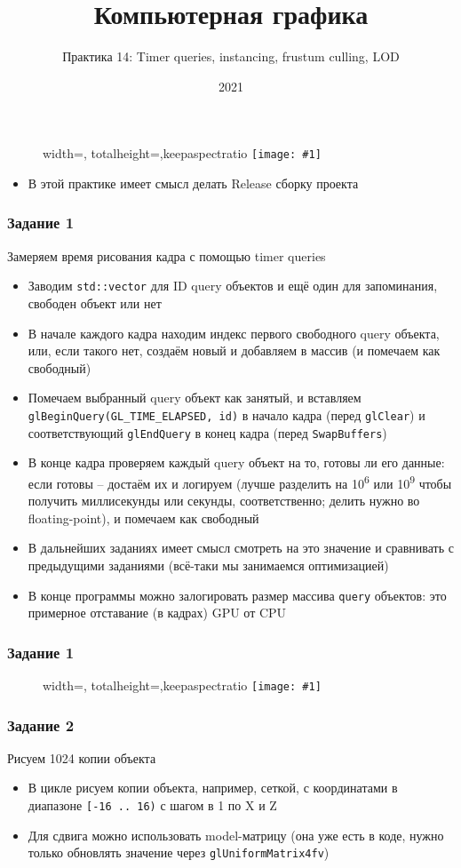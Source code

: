 \documentclass{beamer}
\title{Компьютерная графика}
\subtitle{Практика 14: Timer queries, instancing, frustum culling, LOD}
\date{2021}
\newcommand{\slideimage}[1]{
  \begin{figure}
    \begin{adjustbox}{width=\textwidth, totalheight=\textheight-2\baselineskip-2\baselineskip,keepaspectratio}
      \texttt{[image: \#1]}
    \end{adjustbox}
  \end{figure}
}
\begin{document}
\frame{\titlepage}

\begin{frame}
\slideimage{0.png}
\end{frame}

\begin{frame}[fragile]
\begin{itemize}
\item В этой практике имеет смысл делать Release сборку проекта
\end{itemize}
\end{frame}

\begin{frame}[fragile]
\fontsize{10pt}{10pt}
\frametitle{Задание 1}
Замеряем время рисования кадра с помощью timer queries
\begin{itemize}
\item Заводим \verb|std::vector| для ID query объектов и ещё один для запоминания, свободен объект или нет
\item В начале каждого кадра находим индекс первого свободного query объекта, или, если такого нет, создаём новый и добавляем в массив (и помечаем как свободный)
\item Помечаем выбранный query объект как занятый, и вставляем \verb|glBeginQuery(GL_TIME_ELAPSED, id)| в начало кадра (перед \verb|glClear|) и соответствующий \verb|glEndQuery| в конец кадра (перед \verb|SwapBuffers|)
\item В конце кадра проверяем каждый query объект на то, готовы ли его данные: если готовы -- достаём их и логируем (лучше разделить на 10\textsuperscript{6} или 10\textsuperscript{9} чтобы получить миллисекунды или секунды, соответственно; делить нужно во floating-point), и помечаем как свободный
\item В дальнейших заданиях имеет смысл смотреть на это значение и сравнивать с предыдущими заданиями (всё-таки мы занимаемся оптимизацией)
\item В конце программы можно залогировать размер массива \verb|query| объектов: это примерное отставание (в кадрах) GPU от CPU
\end{itemize}
\end{frame}

\begin{frame}
\frametitle{Задание 1}
\slideimage{0.png}
\end{frame}

\begin{frame}[fragile]
\frametitle{Задание 2}
Рисуем 1024 копии объекта
\begin{itemize}
\item В цикле рисуем копии объекта, например, сеткой, с координатами в диапазоне \verb|[-16 .. 16)| с шагом в 1 по X и Z
\item Для сдвига можно использовать model-матрицу (она уже есть в коде, нужно только обновлять значение через \verb|glUniformMatrix4fv|)
\end{itemize}
\end{frame}
\end{document}
